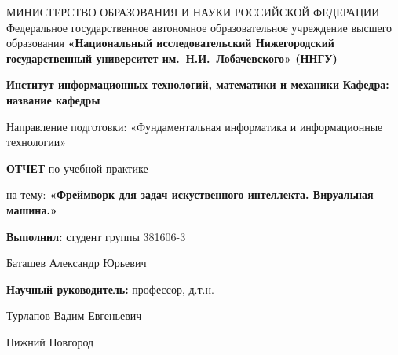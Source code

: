 {
\begin{titlepage}
  \begin{center}
    МИНИСТЕРСТВО ОБРАЗОВАНИЯ И НАУКИ РОССИЙСКОЙ ФЕДЕРАЦИИ\break
    Федеральное государственное автономное образовательное учреждение высшего образования\break
    \textbf{«Национальный исследовательский Нижегородский государственный университет им.~Н.И.~Лобачевского» (ННГУ)}
    \break

    \vspace*{1.25cm}

    \textbf{Институт информационных технологий, математики и механики}\break
    \textbf{Кафедра: название кафедры}
    \vspace{0.5cm}

    Направление подготовки: «Фундаментальная информатика и информационные технологии»\break

    \vspace{2.5cm}

    \large{\textbf{ОТЧЕТ}}\break
    по учебной практике\break

    \vspace{0.25cm}

    на тему:\break
    \large{\textbf{«Фреймворк для задач искуственного интеллекта. Вируальная машина.»}}
  \end{center}

\vspace{2cm}

\hfill\textbf{Выполнил:} студент группы 381606-3

 \hfill Баташев Александр Юрьевич

 \hfill\textbf{Научный руководитель:} профессор, д.т.н.

 \hfill Турлапов Вадим Евгеньевич
\vfill
\begin{center}
  Нижний Новгород
\end{center}
\end{titlepage}
}
